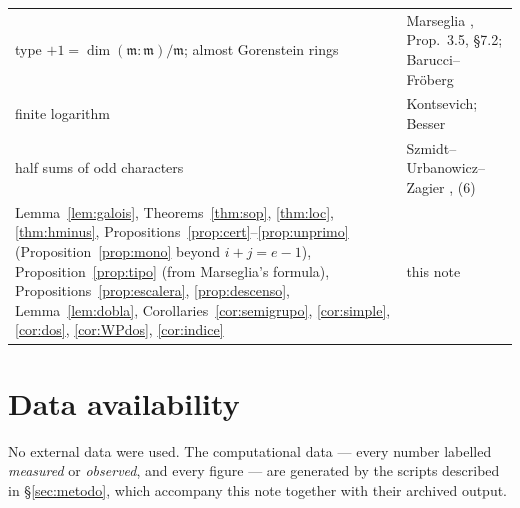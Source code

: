 \documentclass[11pt,a4paper]{article}
\theoremstyle{definition}
\begin{document}
\begin{center}
\begin{tabular}{p{}p{}}
type $+1=\dim(\mathfrak m:\mathfrak m)/\mathfrak m$; almost Gorenstein rings & Marseglia \cite{Mars24}, Prop.~3.5, \S7.2; Barucci--Fröberg \cite{BF97} \\
finite logarithm & Kontsevich; Besser \cite{Bes02} \\
half sums of odd characters & Szmidt--Urbanowicz--Zagier \cite{SUZ95}, (6) \\
Lemma~\ref{lem:galois}, Theorems~\ref{thm:sop}, \ref{thm:loc}, \ref{thm:hminus}, Propositions~\ref{prop:cert}--\ref{prop:unprimo} (Proposition~\ref{prop:mono} beyond $i+j=e-1$), Proposition~\ref{prop:tipo} (from Marseglia's formula), Propositions~\ref{prop:escalera}, \ref{prop:descenso}, Lemma~\ref{lem:dobla}, Corollaries~\ref{cor:semigrupo}, \ref{cor:simple}, \ref{cor:dos}, \ref{cor:WPdos}, \ref{cor:indice} & this note \\
\bottomrule
\end{tabular}
\end{center}

\section*{Data availability}

\noindent No external data were used. The computational data --- every number labelled \emph{measured} or
\emph{observed}, and every figure --- are generated by the scripts described in \S\ref{sec:metodo}, which accompany
this note together with their archived output.
\end{document}
